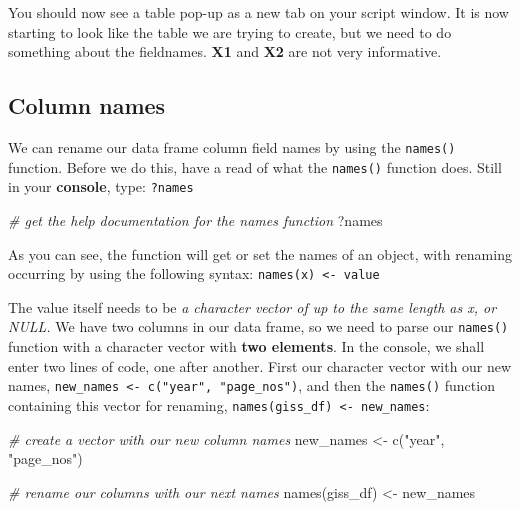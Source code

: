 \documentclass[
]{book}
\newenvironment{Shaded}{\begin{snugshade}}{\end{snugshade}}
\newcommand{\CommentTok}[1]{\textcolor[rgb]{0.56,0.35,0.01}{\textit{#1}}}
\newcommand{\FunctionTok}[1]{\textcolor[rgb]{0.00,0.00,0.00}{#1}}
\newcommand{\NormalTok}[1]{#1}
\newcommand{\OtherTok}[1]{\textcolor[rgb]{0.56,0.35,0.01}{#1}}
\newcommand{\StringTok}[1]{\textcolor[rgb]{0.31,0.60,0.02}{#1}}
\begin{document}
You should now see a table pop-up as a new tab on your script window. It is now starting to look like the table we are trying to create, but we need to do something about the fieldnames. \textbf{X1} and \textbf{X2} are not very informative.

\hypertarget{column-names}{%
\subsection{Column names}\label{column-names}}

We can rename our data frame column field names by using the \texttt{names()} function. Before we do this, have a read of what the \texttt{names()} function does. Still in your \textbf{console}, type: \texttt{?names}

\begin{Shaded}
\begin{Highlighting}[]
\CommentTok{\# get the help documentation for the names function}
\NormalTok{?names}
\end{Highlighting}
\end{Shaded}

As you can see, the function will get or set the names of an object, with renaming occurring by using the following syntax: \texttt{names(x)\ \textless{}-\ value}

The value itself needs to be \emph{a character vector of up to the same length as x, or NULL.} We have two columns in our data frame, so we need to parse our \texttt{names()} function with a character vector with \textbf{two elements}. In the console, we shall enter two lines of code, one after another. First our character vector with our new names, \texttt{new\_names\ \textless{}-\ c("year",\ "page\_nos")}, and then the \texttt{names()} function containing this vector for renaming, \texttt{names(giss\_df)\ \textless{}-\ new\_names}:

\begin{Shaded}
\begin{Highlighting}[]
\CommentTok{\# create a vector with our new column names}
\NormalTok{new\_names }\OtherTok{\textless{}{-}} \FunctionTok{c}\NormalTok{(}\StringTok{"year"}\NormalTok{, }\StringTok{"page\_nos"}\NormalTok{)}

\CommentTok{\# rename our columns with our next names}
\FunctionTok{names}\NormalTok{(giss\_df) }\OtherTok{\textless{}{-}}\NormalTok{ new\_names}
\end{Highlighting}
\end{Shaded}
\end{document}
